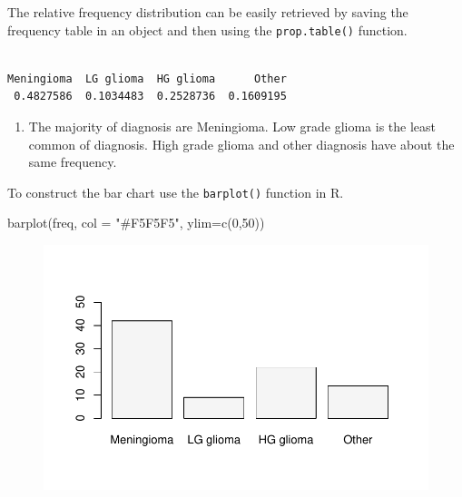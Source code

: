 \documentclass[
  letterpaper,
  DIV=11,
  numbers=noendperiod]{scrreprt}
\newenvironment{Shaded}{\begin{snugshade}}{\end{snugshade}}
\newcommand{\AttributeTok}[1]{\textcolor[rgb]{0.40,0.45,0.13}{#1}}
\newcommand{\DecValTok}[1]{\textcolor[rgb]{0.68,0.00,0.00}{#1}}
\newcommand{\FunctionTok}[1]{\textcolor[rgb]{0.28,0.35,0.67}{#1}}
\newcommand{\NormalTok}[1]{\textcolor[rgb]{0.00,0.23,0.31}{#1}}
\newcommand{\OtherTok}[1]{\textcolor[rgb]{0.00,0.23,0.31}{#1}}
\newcommand{\SpecialCharTok}[1]{\textcolor[rgb]{0.37,0.37,0.37}{#1}}
\newcommand{\StringTok}[1]{\textcolor[rgb]{0.13,0.47,0.30}{#1}}
\providecommand{\tightlist}{%
  \setlength{\itemsep}{0pt}\setlength{\parskip}{0pt}}\usepackage{longtable,booktabs,array}
\begin{document}
The relative frequency distribution can be easily retrieved by saving
the frequency table in an object and then using the
\texttt{prop.table()} function.

\begin{Shaded}
\end{Shaded}

\begin{verbatim}

Meningioma  LG glioma  HG glioma      Other 
 0.4827586  0.1034483  0.2528736  0.1609195 
\end{verbatim}

\begin{enumerate}
\def\labelenumi{\arabic{enumi}.}
\setcounter{enumi}{1}
\tightlist
\item
  The majority of diagnosis are Meningioma. Low grade glioma is the
  least common of diagnosis. High grade glioma and other diagnosis have
  about the same frequency.
\end{enumerate}

To construct the bar chart use the \texttt{barplot()} function in R.

\begin{Shaded}
\begin{Highlighting}[numbers=left,,]
\FunctionTok{barplot}\NormalTok{(freq, }\AttributeTok{col =} \StringTok{"\#F5F5F5"}\NormalTok{, }\AttributeTok{ylim=}\FunctionTok{c}\NormalTok{(}\DecValTok{0}\NormalTok{,}\DecValTok{50}\NormalTok{))}
\end{Highlighting}
\end{Shaded}

\begin{figure}[H]

{\centering \includegraphics{./03-DescriptiveII_files/figure-pdf/unnamed-chunk-3-1.pdf}

}

\end{figure}
\end{document}

